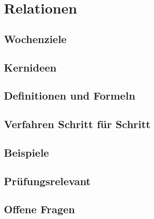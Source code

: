 \chapter{Relationen}
\label{kap:10-relationen}

\section*{Wochenziele}
\begin{wochenziele}
\end{wochenziele}

\section{Kernideen}

\section{Definitionen und Formeln}

\section{Verfahren Schritt für Schritt}

\section{Beispiele}

\section{Prüfungsrelevant}

\section{Offene Fragen}
